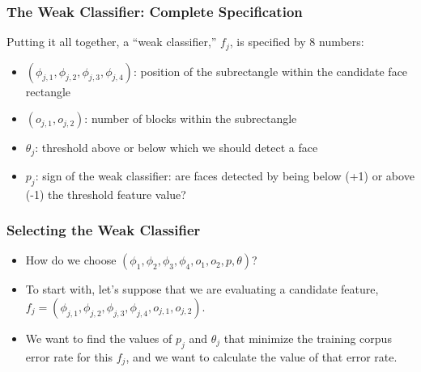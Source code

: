 \documentclass{beamer}
\begin{document}
\begin{frame}
  \frametitle{The Weak Classifier: Complete Specification}

  Putting it all together, a ``weak classifier,'' $f_j$, is specified
  by 8 numbers:
  \begin{itemize}
  \item $(\phi_{j,1},\phi_{j,2},\phi_{j,3},\phi_{j,4})$: position of the subrectangle
    within the candidate face rectangle
  \item $(o_{j,1},o_{j,2})$: number of blocks within the subrectangle
  \item $\theta_j$: threshold above or below which we should detect a face
  \item $p_j$: sign of the weak classifier: are faces detected by
    being below (+1) or above (-1) the threshold feature value?
  \end{itemize}
\end{frame}

\begin{frame}
  \frametitle{Selecting the Weak Classifier}

  \begin{itemize}
    \item 
      How do we choose $(\phi_{1},\phi_{2},\phi_{3},\phi_{4},o_1,o_2,p,\theta)$?
    \item
      To start with, let's suppose that we are evaluating a candidate
      feature,
      $f_j=(\phi_{j,1},\phi_{j,2},\phi_{j,3},\phi_{j,4},o_{j,1},o_{j,2})$.
    \item 
      We want to find the values of $p_j$ and $\theta_j$ that minimize
      the training corpus error rate for this $f_j$, and we want to
      calculate the value of that error rate.
  \end{itemize}
\end{frame}
\end{document}

